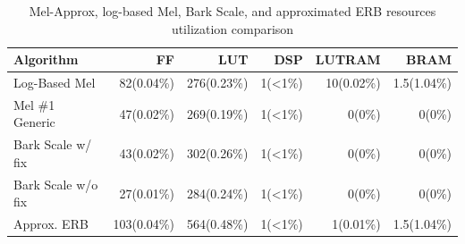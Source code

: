 \begin{table}[H]
    \centering
\begin{tabular}{ !{\color{ytblborder}\vrule}l!{\color{ytblborder}\vrule}rrrrr| } 
    \hline

    \hline
     \color{white}\bf{Algorithm} 
    & \color{white}\bf{FF} 
    & \color{white}\bf{LUT} 
    & \color{white}\bf{DSP} 
    & \color{white}\bf{LUTRAM} 
    & \color{white}\bf{BRAM} \\
    \hline

    \hline
     Log-Based Mel   & 82(0.04\%) & 276(0.23\%) & 1(<1\%) & 10(0.02\%) & 1.5(1.04\%) \\
    \hline
    
    \hline
     Mel \#1 Generic     & 47(0.02\%) & 269(0.19\%) & 1(<1\%) & 0(0\%)  & 0(0\%)    \\
    \hline
    
    \hline
     Bark Scale w/ fix     & 43(0.02\%) & 302(0.26\%) & 1(<1\%) & 0(0\%) & 0(0\%)  \\
    \hline

    \hline
     Bark Scale w/o fix     & 27(0.01\%) & 284(0.24\%) & 1(<1\%) & 0(0\%)  & 0(0\%)    \\
    \hline

    \hline
     Approx. ERB     & 103(0.04\%) & 564(0.48\%) & 1(<1\%) & 1(0.01\%)  & 1.5(1.04\%)    \\
    \hline

    \hline
\end{tabular}
\caption{Mel-Approx, log-based Mel, Bark Scale, and approximated ERB resources utilization comparison}
\label{tbl:IQRD_perf}
\end{table}







